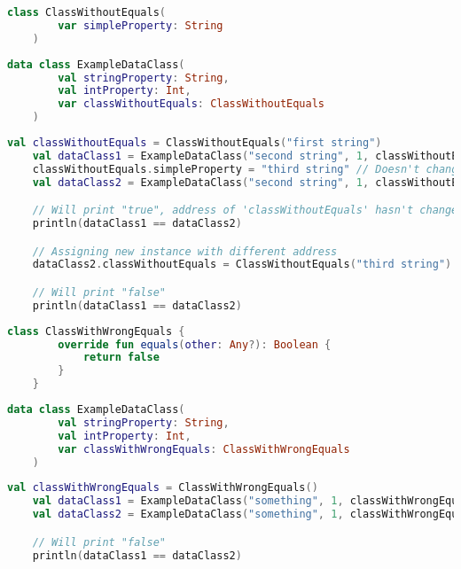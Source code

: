 \begin{lstlisting}[language=Kotlin, title={Simple class without proper "equals" implementation}]
    class ClassWithoutEquals(
        var simpleProperty: String
    )
\end{lstlisting}
\newline
\begin{lstlisting}[language=Kotlin, title={Data class}]
    data class ExampleDataClass(
        val stringProperty: String,
        val intProperty: Int,
        var classWithoutEquals: ClassWithoutEquals
    )
\end{lstlisting}
\newpage
\begin{lstlisting}[language=Kotlin, title={\itq{equals} behavior}]
    val classWithoutEquals = ClassWithoutEquals("first string")
    val dataClass1 = ExampleDataClass("second string", 1, classWithoutEquals)
    classWithoutEquals.simpleProperty = "third string" // Doesn't change instance address
    val dataClass2 = ExampleDataClass("second string", 1, classWithoutEquals)

    // Will print "true", address of 'classWithoutEquals' hasn't changed
    println(dataClass1 == dataClass2)

    // Assigning new instance with different address
    dataClass2.classWithoutEquals = ClassWithoutEquals("third string")

    // Will print "false"
    println(dataClass1 == dataClass2)
\end{lstlisting}

\begin{lstlisting}[language=Kotlin, title={Simple class without proper "equals" implementation}]
    class ClassWithWrongEquals {
        override fun equals(other: Any?): Boolean {
            return false
        }
    }
\end{lstlisting}
\begin{lstlisting}[language=Kotlin, title={Data class}]
    data class ExampleDataClass(
        val stringProperty: String,
        val intProperty: Int,
        var classWithWrongEquals: ClassWithWrongEquals
    )
\end{lstlisting}
\begin{lstlisting}[language=Kotlin, title={\itq{equals} behavior}]
    val classWithWrongEquals = ClassWithWrongEquals()
    val dataClass1 = ExampleDataClass("something", 1, classWithWrongEquals)
    val dataClass2 = ExampleDataClass("something", 1, classWithWrongEquals)

    // Will print "false"
    println(dataClass1 == dataClass2)
\end{lstlisting}


